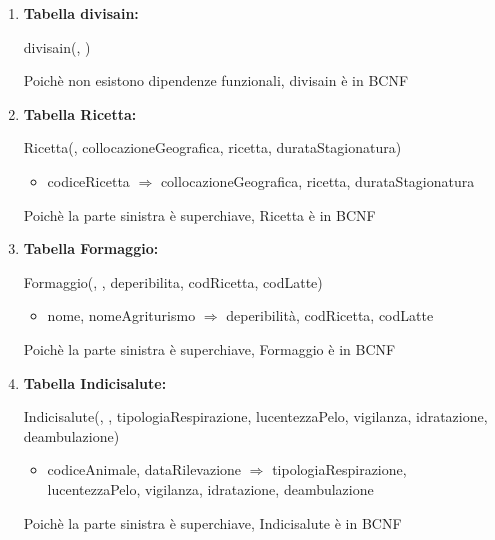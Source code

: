 \documentclass[12pt,a4paper]{article}
\begin{document}
\begin{enumerate}
\item[] \textbf{Tabella divisain:}

divisain(\underline{}, \underline{})

Poichè non esistono dipendenze funzionali, divisain è in BCNF
\vspace{10pt}



\item[] \textbf{Tabella Ricetta:}

Ricetta(\underline{}, collocazioneGeografica, ricetta, durataStagionatura)
\begin{itemize}
\vspace{-5pt}
\item codiceRicetta $\Rightarrow$ collocazioneGeografica, ricetta, durataStagionatura
\vspace{-5pt}
\end{itemize}
Poichè la parte sinistra è superchiave, Ricetta è in BCNF
\vspace{10pt}



\item[] \textbf{Tabella Formaggio:}

Formaggio(\underline{}, \underline{}, deperibilita,  codRicetta,  codLatte)
\begin{itemize}
\vspace{-5pt}
\item nome, nomeAgriturismo $\Rightarrow$ deperibilità, codRicetta, codLatte
\vspace{-5pt}
\end{itemize}
Poichè la parte sinistra è superchiave, Formaggio è in BCNF
\vspace{10pt}



\item[] \textbf{Tabella Indicisalute:}

Indicisalute(\underline{}, \underline{}, tipologiaRespirazione, lucentezzaPelo, vigilanza, idratazione, deambulazione)
\begin{itemize}
\vspace{-5pt}
\item codiceAnimale, dataRilevazione $\Rightarrow$ tipologiaRespirazione, lucentezzaPelo, vigilanza, idratazione, deambulazione
\vspace{-5pt}
\end{itemize}
Poichè la parte sinistra è superchiave, Indicisalute è in BCNF
\vspace{10pt}




\end{enumerate}
\end{document}
